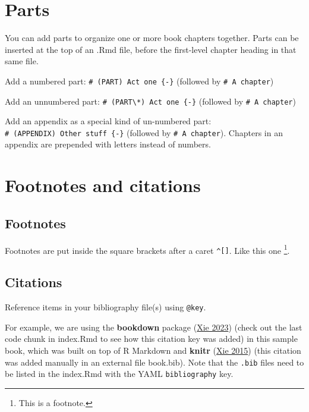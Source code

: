 \documentclass[
]{book}
\begin{document}
\hypertarget{parts}{%
\chapter{Parts}\label{parts}}

You can add parts to organize one or more book chapters together. Parts
can be inserted at the top of an .Rmd file, before the first-level
chapter heading in that same file.

Add a numbered part: \texttt{\#\ (PART)\ Act\ one\ \{-\}} (followed by
\texttt{\#\ A\ chapter})

Add an unnumbered part:
\texttt{\#\ (PART\textbackslash{}*)\ Act\ one\ \{-\}} (followed by
\texttt{\#\ A\ chapter})

Add an appendix as a special kind of un-numbered part:
\texttt{\#\ (APPENDIX)\ Other\ stuff\ \{-\}} (followed by
\texttt{\#\ A\ chapter}). Chapters in an appendix are prepended with
letters instead of numbers.

\hypertarget{footnotes-and-citations}{%
\chapter{Footnotes and citations}\label{footnotes-and-citations}}

\hypertarget{footnotes}{%
\section{Footnotes}\label{footnotes}}

Footnotes are put inside the square brackets after a caret
\texttt{\^{}{[}{]}}. Like this one \footnote{This is a footnote.}.

\hypertarget{citations}{%
\section{Citations}\label{citations}}

Reference items in your bibliography file(s) using \texttt{@key}.

For example, we are using the \textbf{bookdown} package
(\protect\hyperlink{ref-R-bookdown}{Xie 2023}) (check out the last code
chunk in index.Rmd to see how this citation key was added) in this
sample book, which was built on top of R Markdown and \textbf{knitr}
(\protect\hyperlink{ref-xie2015}{Xie 2015}) (this citation was added
manually in an external file book.bib). Note that the \texttt{.bib}
files need to be listed in the index.Rmd with the YAML
\texttt{bibliography} key.
\end{document}
